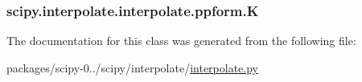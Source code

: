 \subsubsection[{K}]{\setlength{\rightskip}{0pt plus 5cm}scipy.\+interpolate.\+interpolate.\+ppform.\+K}\label{classscipy_1_1interpolate_1_1interpolate_1_1ppform_a38ef1c9b4a8b79c3ecfcb1f1655ca1a4}


The documentation for this class was generated from the following file\+:\begin{DoxyCompactItemize}
\item 
packages/scipy-\/0../scipy/interpolate/\hyperlink{interpolate_8py}{interpolate.\+py}\end{DoxyCompactItemize}

